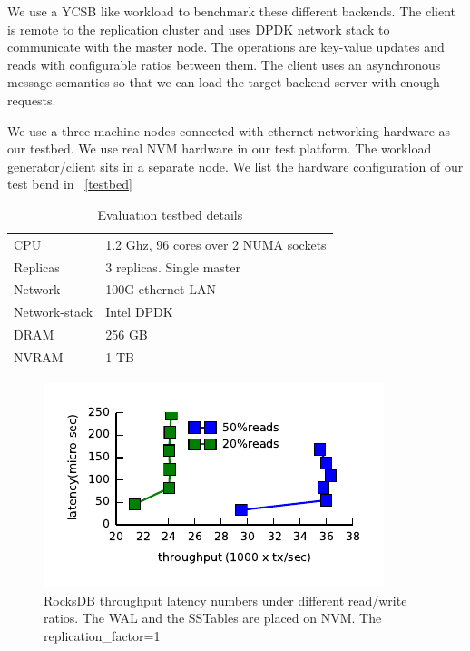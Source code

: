 We use a YCSB like workload to benchmark these different backends. The client is remote to the replication
cluster and uses DPDK network stack to communicate with the master node. The operations are key-value updates and
reads with configurable ratios between them. The client uses an asynchronous message semantics so that we can
load the target backend server with enough requests.

We use a three machine nodes connected with ethernet networking hardware as our testbed. We use real NVM hardware
in our test platform. The workload generator/client sits in a separate node. We list the hardware configuration of
our test bend in ~\autoref{testbed}
\begin{table}[h!]
	\centering
	\begin{tabular}{l|l}
		\hline
		CPU & 1.2 Ghz, 96 cores over 2 NUMA sockets \\
		Replicas & 3 replicas. Single master \\
		Network & 100G ethernet LAN \\
		Network-stack & Intel DPDK \\
		DRAM & 256 GB \\
		NVRAM & 1 TB \\
	\end{tabular}
	\caption{Evaluation testbed details}
	\label{testbed}
\end{table}


\begin{figure}[tbp]   
	\centering
	\includegraphics[width=\linewidth]{plot/rocksdbcompare.pdf} 
	\caption{\small RocksDB throughput latency numbers under different read/write ratios. The WAL and the SSTables are placed on NVM. The replication\_factor=1} 
	\label{plot:rocksdb} 
\end{figure}

